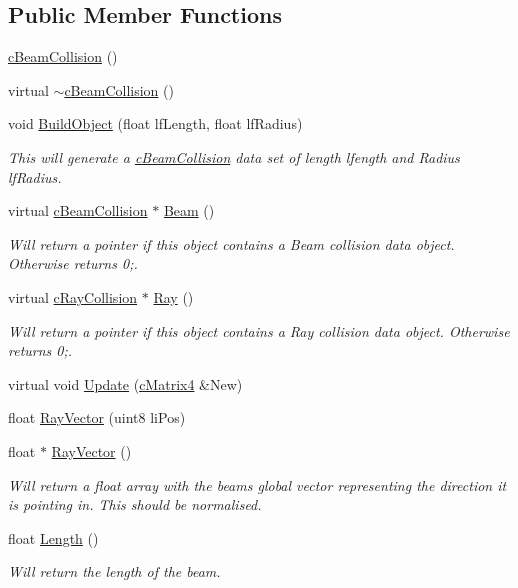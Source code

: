 \subsection*{Public Member Functions}
\begin{DoxyCompactItemize}
\item 
\hyperlink{classc_beam_collision_a894b3f4969dcb27f3dfef46ea18c0e44}{cBeamCollision} ()
\item 
virtual \hyperlink{classc_beam_collision_ad22c22262acc4bb0d06eb5eeb5906407}{$\sim$cBeamCollision} ()
\item 
void \hyperlink{classc_beam_collision_a8341836a9d69ea56fa119276b6ed29f4}{BuildObject} (float lfLength, float lfRadius)
\begin{DoxyCompactList}\small\item\em This will generate a \hyperlink{classc_beam_collision}{cBeamCollision} data set of length lfength and Radius lfRadius. \item\end{DoxyCompactList}\item 
virtual \hyperlink{classc_beam_collision}{cBeamCollision} $\ast$ \hyperlink{classc_beam_collision_af8604917d6e4bc1b81f02909631012dc}{Beam} ()
\begin{DoxyCompactList}\small\item\em Will return a pointer if this object contains a Beam collision data object. Otherwise returns 0;. \item\end{DoxyCompactList}\item 
virtual \hyperlink{classc_ray_collision}{cRayCollision} $\ast$ \hyperlink{classc_beam_collision_aac665850fc71361da9bd3634d7ac8c97}{Ray} ()
\begin{DoxyCompactList}\small\item\em Will return a pointer if this object contains a Ray collision data object. Otherwise returns 0;. \item\end{DoxyCompactList}\item 
virtual void \hyperlink{classc_beam_collision_a6c45762164910884d9b28fcc3f991374}{Update} (\hyperlink{classc_matrix4}{cMatrix4} \&New)
\item 
float \hyperlink{classc_beam_collision_a00cc16fff57846f2fbbc2ec885931be4}{RayVector} (uint8 liPos)
\item 
float $\ast$ \hyperlink{classc_beam_collision_a74776717df15da9950c40c4cd5480dba}{RayVector} ()
\begin{DoxyCompactList}\small\item\em Will return a float array with the beams global vector representing the direction it is pointing in. This should be normalised. \item\end{DoxyCompactList}\item 
float \hyperlink{classc_beam_collision_a2eb26dfd4255ce8a2a10a7b142fb7f42}{Length} ()
\begin{DoxyCompactList}\small\item\em Will return the length of the beam. \item\end{DoxyCompactList}\end{DoxyCompactItemize}
